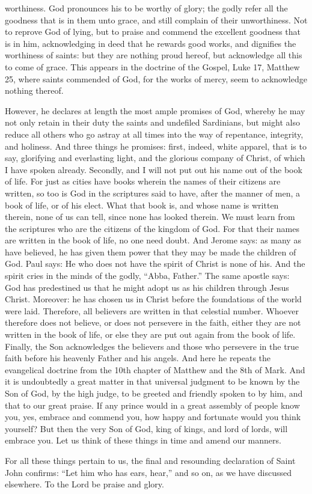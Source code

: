 worthiness. God pronounces his to be worthy of glory; the godly refer all the goodness that is in them unto grace, and still complain of their unworthiness. Not to reprove God of lying, but to praise and commend the excellent goodness that is in him, acknowledging in deed that he rewards good works, and dignifies the worthiness of saints: but they are nothing proud hereof, but acknowledge all this to come of grace. This appears in the doctrine of the Gospel, Luke 17, Matthew 25, where saints commended of God, for the works of mercy, seem to acknowledge nothing thereof.

However, he declares at length the most ample promises of God, whereby he may not only retain in their duty the saints and undefiled Sardinians, but might also reduce all others who go astray at all times into the way of repentance, integrity, and holiness. And three things he promises: first, indeed, white apparel, that is to say, glorifying and everlasting light, and the glorious company of Christ, of which I have spoken already. Secondly, and I will not put out his name out of the book of life. For just as cities have books wherein the names of their citizens are written, so too is God in the scriptures said to have, after the manner of men, a book of life, or of his elect. What that book is, and whose name is written therein, none of us can tell, since none has looked therein. We must learn from the scriptures who are the citizens of the kingdom of God. For that their names are written in the book of life, no one need doubt. And Jerome says: as many as have believed, he has given them power that they may be made the children of God. Paul says: He who does not have the spirit of Christ is none of his. And the spirit cries in the minds of the godly, “Abba, Father.” The same apostle says: God has predestined us that he might adopt us as his children through Jesus Christ. Moreover: he has chosen us in Christ before the foundations of the world were laid. Therefore, all believers are written in that celestial number. Whoever therefore does not believe, or does not persevere in the faith, either they are not written in the book of life, or else they are put out again from the book of life. Finally, the Son acknowledges the believers and those who persevere in the true faith before his heavenly Father and his angels. And here he repeats the evangelical doctrine from the 10th chapter of Matthew and the 8th of Mark. And it is undoubtedly a great matter in that universal judgment to be known by the Son of God, by the high judge, to be greeted and friendly spoken to by him, and that to our great praise. If any prince would in a great assembly of people know you, yes, embrace and commend you, how happy and fortunate would you think yourself? But then the very Son of God, king of kings, and lord of lords, will embrace you. Let us think of these things in time and amend our manners.

For all these things pertain to us, the final and resounding declaration of Saint John confirms: “Let him who has ears, hear,” and so on, as we have discussed elsewhere. To the Lord be praise and glory.
